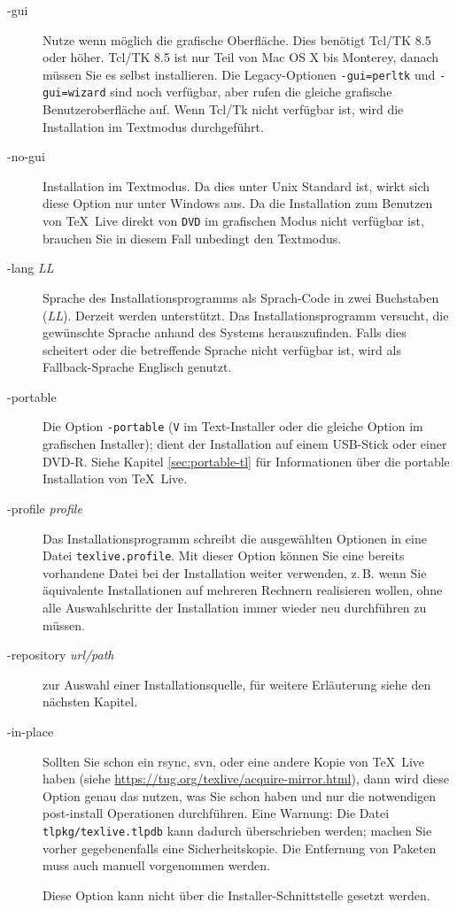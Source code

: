 \documentclass[12pt,ngerman,a4paper,fullparskip]{scrreprt}
\newcommand{\TL}{\TeX\ Live\xspace}
\newcommand{\acro}[1]{\texttt{#1}}
\newcommand{\code}[1]{\texttt{#1}}
\newcommand{\filename}[1]{\texttt{#1}}
\providecommand*{\DVD}{\acro{DVD}\xspace}
\begin{document}
\begin{description}
\item[-gui] Nutze wenn möglich die grafische Oberfläche. Dies benötigt Tcl/TK 8.5  oder höher. Tcl/TK 8.5 ist nur Teil von Mac OS X bis Monterey, danach müssen Sie es selbst installieren. Die Legacy-Optionen \texttt{-gui=perltk} und \texttt{-gui=wizard} sind noch verfügbar, aber rufen die gleiche grafische Benutzeroberfläche auf.  Wenn Tcl/Tk nicht verfügbar ist, wird die Installation im Textmodus durchgeführt.

\item[-no-gui] Installation im Textmodus. Da dies unter Unix Standard ist, wirkt sich diese Option nur
  unter Windows aus. Da die Installation zum Benutzen von \TL direkt von \DVD im grafischen Modus nicht
  verfügbar ist, brauchen Sie in diesem Fall unbedingt den Textmodus.

\item[-lang {\textsl{LL}}] Sprache des Installationsprogramms als Sprach-Code in zwei Buchstaben (\textsl{LL}).
  Derzeit werden unterstützt. Das Installationsprogramm versucht, die gewünschte Sprache anhand des
  Systems herauszufinden. Falls dies scheitert oder die betreffende Sprache nicht verfügbar ist, wird als
  Fallback-Sprache Englisch genutzt.

\item[-portable] Die Option \code{-portable} (\code{V} im Text-Installer oder die gleiche Option im grafischen Installer);  dient der Installation auf einem USB-Stick oder einer DVD-R. Siehe Kapitel \ref{sec:portable-tl} für Informationen über die portable Installation von \TL.

\item[-profile {\textsl{profile}}] Das Installationsprogramm schreibt die ausgewählten Optionen in eine Datei
  \filename{texlive.profile}. Mit dieser Option können
  Sie eine bereits vorhandene Datei bei der Installation weiter verwenden, z.\,B. wenn Sie äquivalente
  Installationen auf mehreren Rechnern realisieren wollen, ohne alle Auswahlschritte der Installation immer
  wieder neu durchführen zu müssen.

\item [-repository {\textsl{url/path}}] zur Auswahl einer Installationsquelle,
  für weitere Erläuterung siehe den nächsten Kapitel.


\item[-in-place] Sollten Sie schon ein rsync, svn, oder eine andere Kopie von 
  \TL{} haben (siehe \url{https://tug.org/texlive/acquire-mirror.html}), dann wird diese Option genau das nutzen, was Sie schon haben und nur die notwendigen post-install Operationen durchführen. Eine Warnung: Die Datei \newline \filename{tlpkg/texlive.tlpdb} kann dadurch überschrieben werden; machen Sie vorher gegebenenfalls eine Sicherheitskopie. Die Entfernung von Paketen muss auch manuell vorgenommen werden. 
	
Diese Option kann nicht über die Installer-Schnittstelle gesetzt werden.
\end{description}
\end{document}
